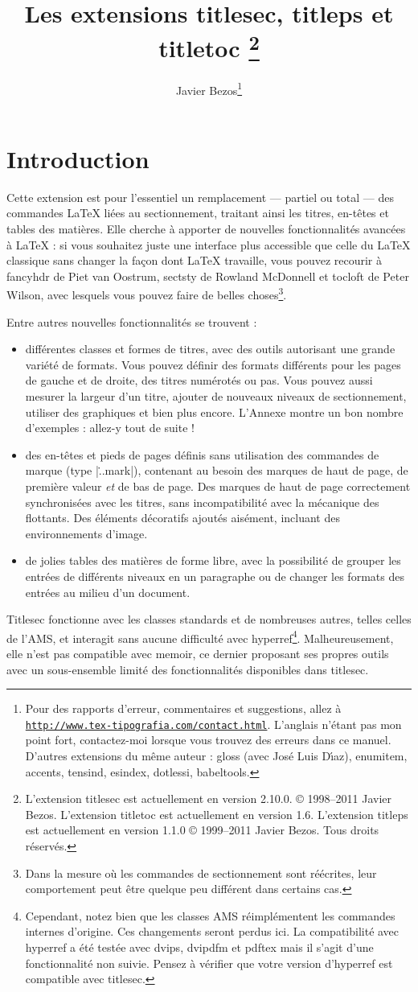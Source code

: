 \documentclass[a4paper]{ltxguide}
\title{Les extensions \textsf{titlesec}, \textsf{titleps} et \textsf{titletoc} 
\footnote{L'extension \textsf{titlesec} est actuellement en version 2.10.0.  
\copyright{} 1998--2011 Javier Bezos. L'extension \textsf{titletoc} est actuellement 
en version 1.6. L'extension \textsf{titleps} est actuellement en version 1.1.0  
\copyright{} 1999--2011 Javier Bezos. Tous droits réservés.}}
\author{Javier Bezos\footnote{Pour des rapports d'erreur, commentaires et 
suggestions, allez à \href{http://www.tex-tipografia.com/contact.html}%
{\texttt{http://www.tex-tipografia.com/contact.html}}.  L'anglais n'étant pas mon 
point fort, contactez-moi lorsque vous trouvez des erreurs dans ce manuel.  
D'autres extensions du même auteur : \textsf{gloss} (avec
Jos\'e Luis D\'{\i}az), \textsf{enumitem, accents, tensind, esindex,
dotlessi, babeltools}.}}
\date{\docdate}
\begin{document}
\maketitle
\tableofcontents
\section{Introduction}

Cette extension est pour l'essentiel un remplacement --- partiel ou total ---
des commandes \LaTeX{} liées au sectionnement, traitant ainsi les titres, 
en-têtes et tables des matières. Elle cherche à apporter de nouvelles
fonctionnalités avancées à \LaTeX{} : si vous souhaitez juste une interface
plus accessible que celle du \LaTeX{} classique sans changer la façon dont
\LaTeX{} travaille, vous pouvez recourir à \textsf{fancyhdr} de Piet van 
Oostrum, \textsf{sectsty} de Rowland McDonnell et \textsf{tocloft} de Peter
Wilson, avec lesquels vous pouvez faire de belles choses\footnote{Dans la
mesure où les commandes de sectionnement sont réécrites, leur comportement peut
être quelque peu différent dans certains cas.}.

Entre autres nouvelles fonctionnalités se trouvent :
\begin{itemize}
\item différentes classes et \og formes\fg{} de titres, avec des outils
autorisant une grande variété de formats. Vous pouvez définir des formats
différents pour les pages de gauche et de droite, des titres numérotés ou pas.
Vous pouvez aussi mesurer la largeur d'un titre, ajouter de nouveaux niveaux
de sectionnement, utiliser des graphiques et bien plus encore. L'Annexe montre
un bon nombre d'exemples : allez-y tout de suite !

\item des en-têtes et pieds de pages définis sans utilisation des commandes de
marque (type |\...mark|), contenant au besoin des marques de haut de page, de
première valeur \emph{et} de bas de page. Des marques de haut de page
correctement synchronisées avec les titres, sans incompatibilité avec la
mécanique des flottants. Des éléments décoratifs ajoutés aisément, incluant des
environnements d'image.

\item de jolies tables des matières de forme libre, avec la possibilité de
grouper les entrées de différents niveaux en un paragraphe ou de changer les
formats des entrées au milieu d'un document. 
\end{itemize}
\textsf{Titlesec} fonctionne avec les classes standards et de nombreuses
autres, telles celles de l'AMS, et interagit sans aucune difficulté avec 
\textsf{hyperref}\footnote{Cependant, notez bien que les classes AMS
réimplémentent les commandes internes d'origine. Ces changements seront perdus
ici. La compatibilité avec \textsf{hyperref} a été testée avec \textsf{dvips}, 
\textsf{dvipdfm} et \textsf{pdftex} mais il s'agit d'une fonctionnalité non 
suivie. Pensez à vérifier que votre version d'\textsf{hyperref} est compatible 
avec \textsf{titlesec}.}. Malheureusement, elle n'est pas compatible avec 
\textsf{memoir}, ce dernier proposant ses propres outils avec un sous-ensemble limité des fonctionnalités disponibles dans \textsf{titlesec}.
\end{document}
